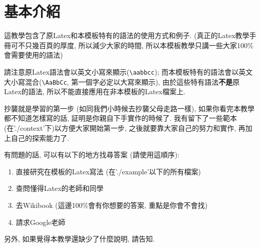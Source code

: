 \section{基本介紹}

%

這教學包含了原Latex和本模板特有的語法的使用方式和例子. (真正的Latex教學手冊可不只幾百頁的厚度, 所以減少大家的時間, 所以本模板教學只講一些大家100\%會需要使用的語法)

請注意原Latex語法會以英文小寫來顯示(\verb|\aabbcc|); 而本模板特有的語法會以英文大小寫混合(\verb|\AaBbCc|, 第一個字必定以大寫來顯示), 由於這些特有語法\textbf{不是}原Latex的語法, 所以不能直接應用在非本模板的Latex檔案上.

抄襲就是學習的第一步 (如同我們小時候去抄襲父母走路一樣), 如果你看完本教學都不知道怎樣寫的話, 証明是你親自下手實作的時候了. 我有留下了一些範本 (在'./context'下)以方便大家開始第一步, 之後就要靠大家自己的努力和實作, 再加上自己的探索能力了.

有問題的話, 可以有以下的地方找尋答案 (請使用這順序):
\begin{enumerate}
  \item 直接研究在模板的Latex寫法 (在'./example'以下的所有檔案)
  \item 查問懂得Latex的老師和同學 %
  \item 去Wikibook (這邊100\%會有你想要的答案, 重點是你會不會找)%
  \item 請求Google老師 %
\end{enumerate}

另外, 如果覺得本教學還缺少了什麼說明, 請告知.

\EndChapter
